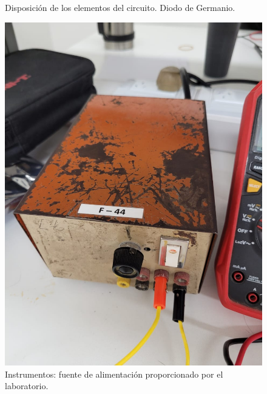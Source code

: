 \documentclass[chaptersright]{informeutn}
\begin{document}
\begin{figure}[h!]
\begin{minipage}{0.5\textwidth}
            \caption{Disposición de los elementos del circuito. Diodo de Germanio.}
            \label{fig:germanio}
        \end{minipage}
    \end{figure}
    \begin{figure}[h!]
        \centering
        \begin{minipage}{0.3\textwidth}
            \centering
            \includegraphics[width=\textwidth]{pictures/fuentealim.jpeg}
            \caption{Instrumentos: fuente de alimentación proporcionado por el laboratorio.}
        \end{minipage}
        \hspace{0.05\textwidth} %
        \begin{minipage}{0.3\textwidth}
            \centering

\end{minipage}
\end{figure}
\end{document}
